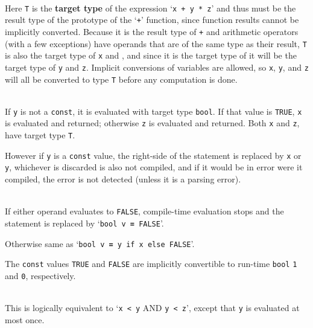 \documentclass[12pt]{article}
\newcommand{\TT}[1]{{\tt \bfseries #1}}
\newcommand{\key}[1]{{\rm \bfseries #1}}
\newenvironment{indpar}[1][0.3in]%
	{\begin{list}{}%
		     {\setlength{\itemsep}{0in}%
		      \setlength{\topsep}{0in}%
		      \setlength{\parsep}{1ex}%
		      \setlength{\labelwidth}{#1}%
		      \setlength{\leftmargin}{#1}%
		      \addtolength{\leftmargin}{\labelsep}}%
	 \item}%
	{\end{list}}
\begin{document}
\begin{indpar}
\hspace*{-0.2in}{\tt T v \TT{=} x + y * z} \\
       Here {\tt T} is the \key{target type} of the expression
       `{\tt x + y * z}' and thus must be the result type of the prototype
       of the `{\tt +}' function, since function results cannot be
       implicitly converted.  Because it is the result type of {\tt +} and
       arithmetic operators (with a few exceptions)
       have operands that are of the same
       type as their result,
       {\tt T} is also the target type of {\tt x} and {\tt *}, and since it is
       the target type of {\tt *} it will be the target type of {\tt y}
       and {\tt z}.  Implicit conversions of variables are allowed,
       so {\tt x}, {\tt y}, and {\tt z} will all be converted
       to type {\tt T} before any computation is done.

\hspace*{-0.2in}{\tt T v \TT{=} x \TT{if} y \TT{else} z} \\
      If {\tt y} is not a {\tt const}, it is evaluated with
      target type {\tt bool}.  If that value
      is {\tt TRUE}, {\tt x} is evaluated and returned; otherwise
      {\tt z} is evaluated and returned.  Both {\tt x} and {\tt z},
      have target type {\tt T}.

      However if {\tt y} is a {\tt const} value, the right-side of
      the statement is replaced by {\tt x} or {\tt y}, whichever
      is discarded is also not compiled, and if it would be in error
      were it compiled, the error is not detected (unless it is a parsing
      error).

\hspace*{-0.2in}{\tt bool v = x \TT{AND} y} \\
      If either operand evaluates to {\tt FALSE},
      compile-time evaluation stops and the statement is replaced by
      `{\tt bool v \TT{=} FALSE}'.

      Otherwise same as `{\tt bool v \TT{=} y if x else FALSE}'.

      The {\tt const} values {\tt TRUE}
      and {\tt FALSE} are implicitly convertible to run-time {\tt bool}
      {\tt 1} and {\tt 0}, respectively.
 
\hspace*{-0.2in}{\tt x \TT{<} y \TT{<} z} \\
      This is logically equivalent to `{\tt x < y} AND {\tt y < z}', except that
      {\tt y} is evaluated at most once.


\end{indpar}
\end{document}
